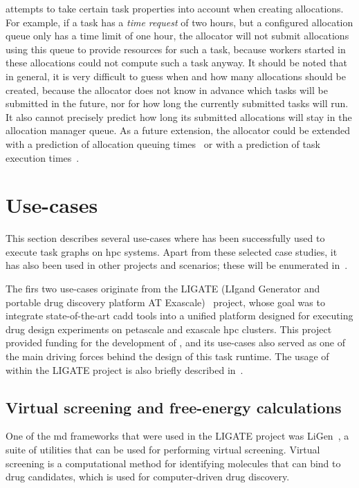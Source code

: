 \Autoalloc{} attempts to take certain task properties into account when creating
allocations. For example, if a task has a \emph{time request} of two hours, but a configured
allocation queue only has a time limit of one hour, the allocator will not submit allocations using
this queue to provide resources for such a task, because workers started in these allocations could
not compute such a task anyway. It should be noted that in general, it is very difficult to guess
when and how many allocations should be created, because the allocator does not know in advance
which tasks will be submitted in the future, nor for how long the currently submitted tasks will
run. It also cannot precisely predict how long its submitted allocations will stay in the
allocation manager queue. As a future extension, the allocator could be extended with a prediction
of allocation queuing times~\cite{allocation-duration-prediction} or with a prediction of task execution
times~\cite{task-duration-prediction}.


\section{Use-cases}
This section describes several use-cases where \hyperqueue{} has been successfully used
to execute task graphs on \gls{hpc} systems. Apart from these selected case studies,
it has also been used in other projects and scenarios; these will be enumerated
in~.

The firs two use-cases originate from the LIGATE (LIgand Generator and portable drug discovery
platform AT Exascale)~\cite{ligate} project, whose goal was to integrate state-of-the-art
\gls{cadd} tools into a unified platform designed for executing drug design
experiments on petascale and exascale \gls{hpc} clusters. This project provided
funding for the development of \hyperqueue{}, and its use-cases also served as one of the
main driving forces behind the design of this task runtime. The usage of \hyperqueue{}
within the LIGATE project is also briefly described in~\cite{ligate}.

\subsection{Virtual screening and free-energy calculations}
\label{sec:hq-usecase-ligen}
One of the \gls{md} frameworks that were used in the LIGATE project was
LiGen~\cite{ligen,ligen_exscalate}, a suite of utilities that can be used for performing virtual
screening. Virtual screening is a computational method for identifying molecules that can bind to
drug candidates, which is used for computer-driven drug discovery.

